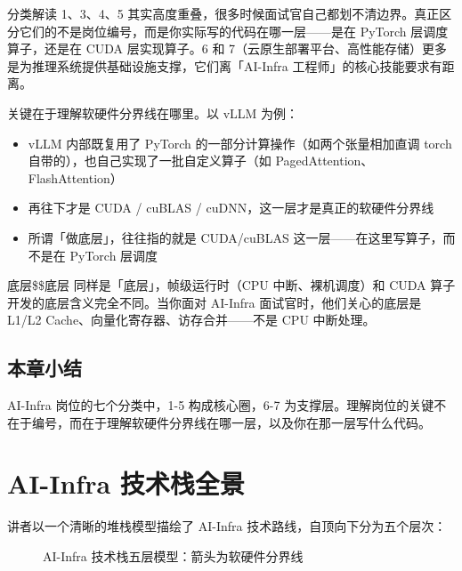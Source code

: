 \documentclass[a4paper]{article}
\begin{document}
\begin{knowledgebox}{分类解读}
1、3、4、5 其实高度重叠，很多时候面试官自己都划不清边界。真正区分它们的不是岗位编号，而是你实际写的代码在哪一层——是在 PyTorch 层调度算子，还是在 CUDA 层实现算子。6 和 7（云原生部署平台、高性能存储）更多是为推理系统提供基础设施支撑，它们离「AI-Infra 工程师」的核心技能要求有距离。
\end{knowledgebox}

关键在于理解软硬件分界线在哪里。以 vLLM 为例：

\begin{itemize}
    \item vLLM 内部既复用了 PyTorch 的一部分计算操作（如两个张量相加直调 torch 自带的），也自己实现了一批自定义算子（如 PagedAttention、FlashAttention）
    \item 再往下才是 CUDA / cuBLAS / cuDNN，这一层才是真正的软硬件分界线
    \item 所谓「做底层」，往往指的就是 CUDA/cuBLAS 这一层——在这里写算子，而不是在 PyTorch 层调度
\end{itemize}

\begin{importantbox}{底层\$\neq\$底层}
同样是「底层」，帧级运行时（CPU 中断、裸机调度）和 CUDA 算子开发的底层含义完全不同。当你面对 AI-Infra 面试官时，他们关心的底层是 L1/L2 Cache、向量化寄存器、访存合并——不是 CPU 中断处理。
\end{importantbox}

\subsection{本章小结}
AI-Infra 岗位的七个分类中，1-5 构成核心圈，6-7 为支撑层。理解岗位的关键不在于编号，而在于理解软硬件分界线在哪一层，以及你在那一层写什么代码。

\section{AI-Infra 技术栈全景}

讲者以一个清晰的堆栈模型描绘了 AI-Infra 技术路线，自顶向下分为五个层次：

\begin{figure}[H]
\centering
{}
\caption{AI-Infra 技术栈五层模型：箭头为软硬件分界线}
\end{figure}
\end{document}
